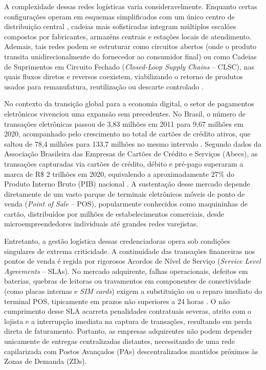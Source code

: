 \documentclass[preprint,12pt,authoryear]{elsarticle}
\begin{document}
A complexidade dessas redes logísticas varia consideravelmente. Enquanto certas configurações operam em esquemas simplificados com um único centro de distribuição central \citep{SINGH2018343}, cadeias mais sofisticadas integram múltiplos escalões compostos por fabricantes, armazéns centrais e estações locais de atendimento. Ademais, tais redes podem se estruturar como circuitos abertos (onde o produto transita unidirecionalmente do fornecedor ao consumidor final) ou como Cadeias de Suprimentos em Circuito Fechado (\emph{Closed-Loop Supply Chains} -- CLSC), nas quais fluxos diretos e reversos coexistem, viabilizando o retorno de produtos usados para remanufatura, reutilização ou descarte controlado \citep{AMIN2017316}.

No contexto da transição global para a economia digital, o setor de pagamentos eletrônicos vivenciou uma expansão sem precedentes. No Brasil, o número de transações eletrônicas passou de 3,83 milhões em 2011 para 9,67 milhões em 2020, acompanhado pelo crescimento no total de cartões de crédito ativos, que saltou de 78,4 milhões para 133,7 milhões no mesmo intervalo \citep{TNS}. Segundo dados da Associação Brasileira das Empresas de Cartões de Crédito e Serviços (Abecs), as transações capturadas via cartões de crédito, débito e pré-pago superaram a marca de R\$ 2 trilhões em 2020, equivalendo a aproximadamente 27\% do Produto Interno Bruto (PIB) nacional \citep{Valenti1998}. A sustentação desse mercado depende diretamente de um vasto parque de terminais eletrônicos móveis de ponto de venda (\emph{Point of Sale} -- POS), popularmente conhecidos como maquininhas de cartão, distribuídos por milhões de estabelecimentos comerciais, desde microempreendedores individuais até grandes redes varejistas.

Entretanto, a gestão logística dessas credenciadoras opera sob condições singulares de extrema criticidade. A continuidade das transações financeiras nos pontos de venda é regida por rigorosos Acordos de Nível de Serviço (\emph{Service Level Agreements} -- SLAs). No mercado adquirente, falhas operacionais, defeitos em baterias, quebras de leitoras ou travamentos em componentes de conectividade (como placas internas e \emph{SIM cards}) exigem a substituição ou o reparo imediato do terminal POS, tipicamente em prazos não superiores a 24 horas \citep{Silva2021Adquirencia}. O não cumprimento desse SLA acarreta penalidades contratuais severas, atrito com o lojista e a interrupção imediata na captura de transações, resultando em perda direta de faturamento. Portanto, as empresas adquirentes não podem depender unicamente de entregas centralizadas distantes, necessitando de uma rede capilarizada com Postos Avançados (PAs) descentralizados mantidos próximos às Zonas de Demanda (ZDs).
\end{document}
